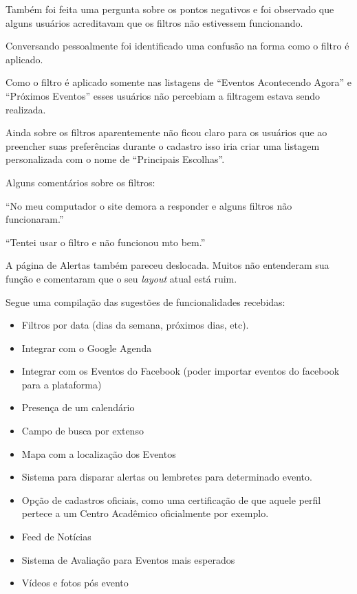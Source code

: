 \par Também foi feita uma pergunta sobre os pontos negativos e foi observado que alguns usuários acreditavam que os filtros não estivessem funcionando.
\par Conversando pessoalmente foi identificado uma confusão na forma como o filtro é aplicado.
\par Como o filtro é aplicado somente nas listagens de ``Eventos Acontecendo Agora'' e ``Próximos Eventos'' esses usuários não percebiam a filtragem estava sendo realizada.
\par Ainda sobre os filtros aparentemente não ficou claro para os usuários que ao preencher suas preferências durante o cadastro isso iria criar uma listagem personalizada com o nome de ``Principais Escolhas''.
\par Alguns comentários sobre os filtros:
\par ``No meu computador o site demora a responder e alguns filtros não funcionaram.''\\
\par ``Tentei usar o filtro e não funcionou mto bem.''\\

\par A página de Alertas também pareceu deslocada. Muitos não entenderam sua função e comentaram que o seu \emph{layout} atual está ruim.
\par Segue uma compilação das sugestões de funcionalidades recebidas:
\begin{itemize}
\item Filtros por data (dias da semana, próximos dias, etc).
\item Integrar com o Google Agenda
\item Integrar com os Eventos do Facebook (poder importar eventos do facebook para a plataforma)
\item Presença de um calendário
\item Campo de busca por extenso
\item Mapa com a localização dos Eventos
\item Sistema para disparar alertas ou lembretes para determinado evento.
\item Opção de cadastros oficiais, como uma certificação de que aquele perfil pertece a um Centro Acadêmico oficialmente por exemplo.
\item Feed de Notícias
\item Sistema de Avaliação para Eventos mais esperados
\item Vídeos e fotos pós evento
\end{itemize}

